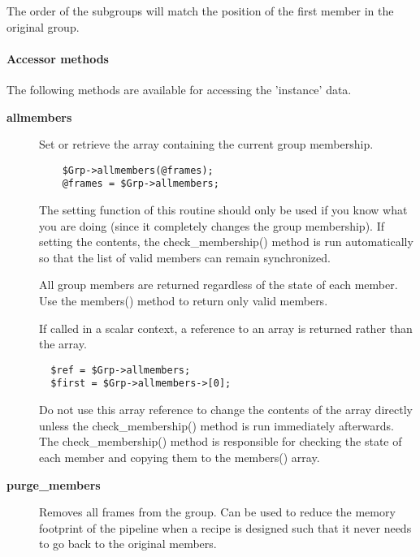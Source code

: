 \begin{description}
\begin{description}
\begin{description}
The order of the subgroups will match the position of the first
member in the original group.

\end{description}
\paragraph*{Accessor methods\label{ORAC::Group_Accessor_methods}}


The following methods are available for accessing the
'instance' data.

\begin{description}

\item[{\textbf{allmembers}}] \mbox{}

Set or retrieve the array containing the current group membership.

\begin{verbatim}
    $Grp->allmembers(@frames);
    @frames = $Grp->allmembers;
\end{verbatim}


The setting function of this routine should only be used
if you know what you are doing (since it completely changes the group
membership). If setting the contents, the check\_membership() method
is run automatically so that the list of valid members can remain
synchronized.



All group members are returned regardless of the state of each member.
Use the members() method to return only valid members.



If called in a scalar context, a reference to an array is returned
rather than the array.

\begin{verbatim}
  $ref = $Grp->allmembers;
  $first = $Grp->allmembers->[0];
\end{verbatim}


Do not use this array reference to change the contents of the array
directly unless the check\_membership() method is run immediately
afterwards. The check\_membership() method is responsible for
checking the state of each member and copying them to the members()
array.


\item[{\textbf{purge\_members}}] \mbox{}

Removes all frames from the group. Can be used to reduce the memory
footprint of the pipeline when a recipe is designed such that it never
needs to go back to the original members.


\end{description}
\end{description}
\end{description}
